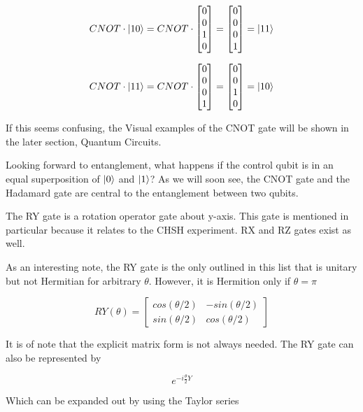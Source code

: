 \documentclass[12pt]{article}
\begin{document}
$$
CNOT \cdot \ket{10} =
CNOT \cdot
\begin{bmatrix} 0 \\ 0 \\ 1 \\ 0 \end{bmatrix}
=
\begin{bmatrix} 0 \\ 0 \\ 0 \\ 1 \end{bmatrix} = \ket{11}
$$

$$
CNOT \cdot \ket{11} =
CNOT \cdot
\begin{bmatrix} 0 \\ 0 \\ 0 \\ 1 \end{bmatrix}
=
\begin{bmatrix} 0 \\ 0 \\ 1 \\ 0 \end{bmatrix} = \ket{10}
$$

If this seems confusing, the Visual examples of the CNOT gate will be shown in the later section, Quantum Circuits. 

Looking forward to entanglement, what happens if the control qubit is in an equal superposition of $\ket{0}$ and $\ket{1}$? As we will soon see, the CNOT gate and the Hadamard gate are central to the entanglement between two qubits.

The RY gate is a rotation operator gate about y-axis. This gate is mentioned in particular because it relates to the CHSH experiment. RX and RZ gates exist as well.

As an interesting note, the RY gate is the only outlined in this list that is unitary but not Hermitian for arbitrary $\theta$. However, it is Hermition only if $\theta = 
\pi$

$$
RY(\theta) =
\begin{bmatrix}
cos(\theta / 2) & -sin(\theta / 2) \\
sin(\theta / 2) &  cos(\theta / 2)
\end{bmatrix}
$$

It is of note that the explicit matrix form is not always needed. The RY gate can also be represented by 

$$
e^{-i \frac{\theta}{2} Y}
$$

Which can be expanded out by using the Taylor series
\end{document}
